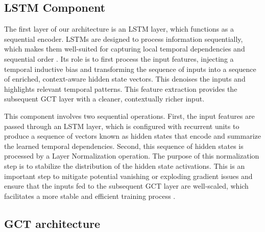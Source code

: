 \documentclass[acmsmall]{acmart}
\begin{document}
{\color{black}
\subsection{LSTM Component} \label{subsec:LSTM}

The first layer of our architecture is an LSTM layer, which functions as a sequential encoder. LSTMs are designed to process information sequentially, which makes them well-suited for capturing local temporal dependencies and sequential order \cite{sak2014long}. Its role is to first process the input features, injecting a temporal inductive bias and transforming the sequence of inputs into a sequence of enriched, context-aware hidden state vectors. This denoises the inputs and highlights relevant temporal patterns. This feature extraction provides the subsequent GCT layer with a cleaner, contextually richer input.

This component involves two sequential operations. First, the input features are passed through an LSTM layer, which is configured with recurrent units to produce a sequence of vectors known as hidden states that encode and summarize the learned temporal dependencies. Second, this sequence of hidden states is processed by a Layer Normalization operation. The purpose of this normalization step is to stabilize the distribution of the hidden state activations. This is an important step to mitigate potential vanishing or exploding gradient issues and ensure that the inputs fed to the subsequent GCT layer are well-scaled, which facilitates a more stable and efficient training process \cite{ba2016layer}.

}

\subsection{{\color{blue}GCT architecture}} \label{subsec:transformer}
\end{document}
